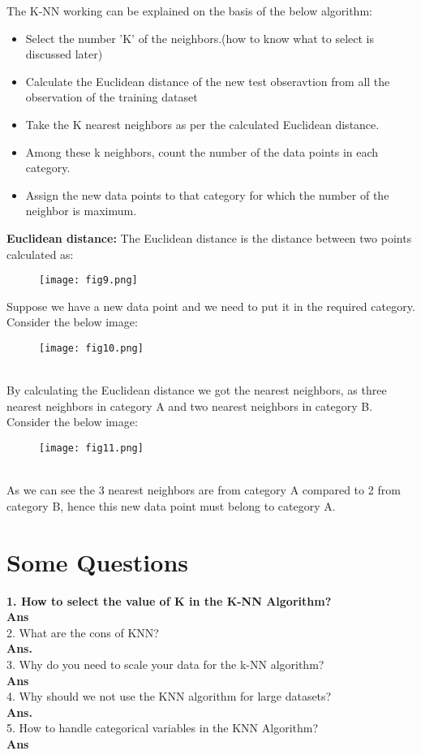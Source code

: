 \documentclass[a4paper, 11pt]{article}
\begin{document}
The K-NN working can be explained on the basis of the below algorithm:
\begin{itemize}
    \item Select the number 'K' of the neighbors.(how to know what to select is discussed later)
    \item Calculate the Euclidean distance of the new test obseravtion from all the observation of the training dataset 
    \item Take the K nearest neighbors as per the calculated Euclidean distance.
    \item Among these k neighbors, count the number of the data points in each category.
    \item Assign the new data points to that category for which the number of the neighbor is maximum.
\end{itemize}
\textbf{Euclidean distance: }The Euclidean distance is the distance between two points calculated as:
\begin{figure}[h!]
    \texttt{[image: fig9.png]}
    \label{fig:fig9}
  \end{figure}

\pagebreak
Suppose we have a new data point and we need to put it in the required category. Consider the below image:\\
\begin{figure}[ht!]
    \texttt{[image: fig10.png]}
    \label{fig:fig10}
  \end{figure}
  \\By calculating the Euclidean distance we got the nearest neighbors, as three nearest neighbors in category A and two nearest neighbors in category B. Consider the below image:
  \begin{figure}[ht!]
    \texttt{[image: fig11.png]}
    \label{fig:fig11}
  \end{figure}
  \\ As we can see the 3 nearest neighbors are from category A compared to 2 from category B, hence this new data point must belong to category A.


\section{Some Questions}
\textbf{1. How to select the value of K in the K-NN Algorithm?}\\
\textbf{Ans}\\
2. What are the cons of KNN? \\
\textbf{Ans.} \\
3. Why do you need to scale your data for the k-NN algorithm? \\ 
\textbf{Ans} \\
4. Why should we not use the KNN algorithm for large datasets? \\
\textbf{Ans.}  \\          
5. How to handle categorical variables in the KNN Algorithm?\\
\textbf{Ans}  \\

\end{document}
